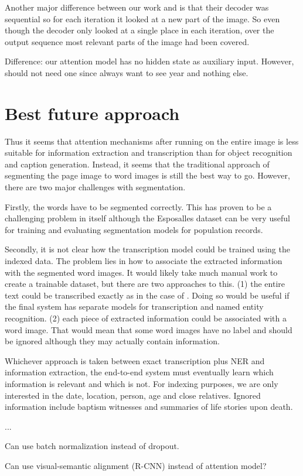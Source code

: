 Another major difference between our work and \cite{AttendAndTell} is that their decoder was sequential so for each iteration it looked at a new part of the image. So even though the decoder only looked at a single place in each iteration, over the output sequence most relevant parts of the image had been covered.

Difference: our attention model has no hidden state as auxiliary input. However, should not need one since always want to see year and nothing else.

\section{Best future approach}

Thus it seems that attention mechanisms after running on the entire image is less suitable for information extraction and transcription than for object recognition and caption generation. Instead, it seems that the traditional approach of segmenting the page image to word images is still the best way to go. However, there are two major challenges with segmentation.

Firstly, the words have to be segmented correctly. This has proven to be a challenging problem in itself although the Esposalles dataset \cite{esposalles} can be very useful for training and evaluating segmentation models for population records.

Secondly, it is not clear how the transcription model could be trained using the indexed data. The problem lies in how to associate the extracted information with the segmented word images. It would likely take much manual work to create a trainable dataset, but there are two approaches to this. (1) the entire text could be transcribed exactly as in the case of \cite{esposalles}. Doing so would be useful if the final system has separate models for transcription and named entity recognition.
(2) each piece of extracted information could be associated with a word image. That would mean that some word images have no label and should be ignored although they may actually contain information.

Whichever approach is taken between exact transcription plus NER and information extraction, the end-to-end system must eventually learn which information is relevant and which is not.
For indexing purposes, we are only interested in the date, location, person, age and close relatives. Ignored information include baptism witnesses and summaries of life stories upon death.


...

Can use batch normalization instead of dropout.

Can use visual-semantic alignment (R-CNN) instead of attention model?
